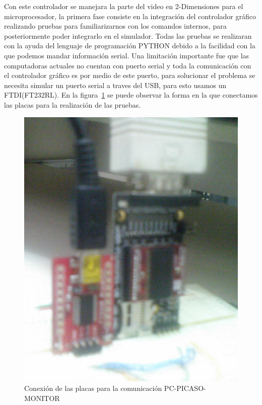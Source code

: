 Con este controlador se manejara la parte del video en 2-Dimensiones para el microprocesador, la primera fase consiste en la integraci\'on del controlador gr\'afico realizando pruebas para familiarizarnos con los comandos internos, para posteriormente poder integrarlo en el simulador. Todas las pruebas se realizaran con la ayuda del lenguaje de programaci\'on PYTHON debido a la facilidad con la que podemos mandar informaci\'on serial. Una limitaci\'on importante fue que las computadoras actuales no cuentan con puerto serial y toda la comunicaci\'on con el controlador gr\'afico es por medio de este puerto, para solucionar el problema se necesita simular un puerto serial a traves del USB, para esto usamos un FTDI(FT232RL). En la figura~\ref{fig:serie} se puede observar la forma en la que conectamos las placas para la realizaci\'on de las pruebas.\medskip

\begin{figure}[H]
\centering
\includegraphics[scale=0.1]{serie}
\caption{Conexi\'on  de las placas para la comunicaci\'on PC-PICASO-MONITOR}\label{fig:serie}
\end{figure}

